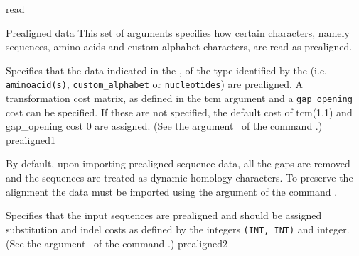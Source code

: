 \begin{command}{read}{}
\begin{arguments}
\begin{argumentgroup}{Prealigned data}
	This set of arguments specifies how certain characters, namely sequences, amino acids 
	and custom alphabet characters, are read as prealigned.
	
            {Specifies that the data indicated in the \poystring, of the type identified by the \poylident (i.e. 
            \texttt{aminoacid(s)}, \texttt{custom\_alphabet} or \texttt{nucleotides}) are prealigned.
            A transformation cost matrix, as defined in the tcm \poystring argument and a \texttt{gap\_opening}
            cost can be specified.  If these are not specified, the default cost of tcm(1,1) and gap\_opening
            cost $ 0 $ are assigned. (See the argument~ 
            of the command .)}
            {prealigned1}
        
         \begin{statement}
            By default, upon importing prealigned sequence data, all the gaps are
             removed and the sequences are treated as dynamic homology characters.
             To preserve the alignment the data must be imported using the
              argument of the command .
          \end{statement}
         
            {Specifies that the input sequences are prealigned and should be
            assigned substitution and indel costs as defined by the
             integers \texttt{(INT, INT)} and  integer. (See the 
            argument~ 
            of the command .)}
            {prealigned2}
            
           \end{argumentgroup}
            
           \end{arguments}
	        


\end{command}
